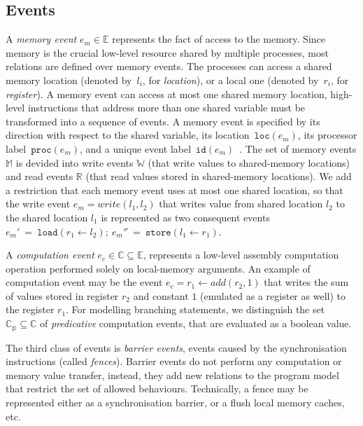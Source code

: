 \subsection{Events}
\label{ch:wmm:model:events}

A \textit{memory event} $e_m \in \mathbb{E}$ represents the fact of access to the memory. Since memory is the crucial low-level resource shared by multiple processes, most relations are defined over memory events. 
The processes can access a shared memory location (denoted by~$l_i$, for \textit{location}), or a local one (denoted by~$r_i$, for \textit{register}). A memory event can access at most one shared memory location, high-level instructions that address more than one shared variable must be transformed into a sequence of events. A memory event is specified by its direction with respect to the shared variable, its location~$\mathtt{loc}(e_m)$, its processor label~$\mathtt{proc}(e_m)$, and a unique event label~$\mathtt{id}(e_m)$~\cite{alglave2010shared}. 
The set of memory events $\mathbb{M}$ is devided into write events $\mathbb{W}$ (that write values to shared-memory locations) and read events $\mathbb{R}$ (that read values stored in shared-memory locations).
We add a restriction that each memory event uses at most one shared location, so that the write event $e_m = write(l_1, l_2)$ that writes value from shared location $l_2$ to the shared location $l_1$ is represented as two consequent events $e_m'~=~\mathtt{load}(r_1 \leftarrow l_2); \ e_m''~=~\mathtt{store}(l_1 \leftarrow r_1)$.

A \textit{computation event} $e_c \in \mathbb{C} \subseteq \mathbb{E}$, represents a low-level assembly computation operation performed solely on local-memory arguments. An example of computation event may be the event $e_c = r_1 \leftarrow add(r_2, 1)$ that writes the sum of values stored in register $r_2$ and constant $1$ (emulated as a register as well) to the register $r_1$. For modelling branching statements, we distinguish the set $\mathbb{C_{p}} \subseteq \mathbb{C}$ of \textit{predicative} computation events, that are evaluated as a boolean value.%

The third class of events is \textit{barrier events}, events caused by the synchronisation instructions (called \textit{fences}). Barrier events do not perform any computation or memory value transfer, instead, they add new relations to the program model that restrict the set of allowed behaviours. Technically, a fence may be represented either as a synchronisation barrier, or a flush local memory caches, etc.


